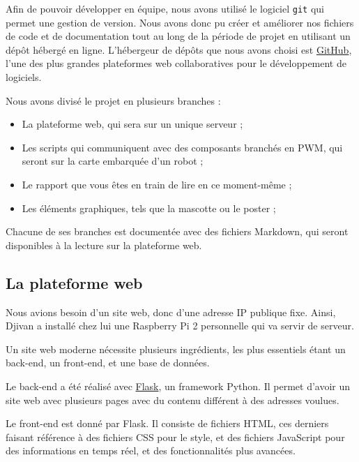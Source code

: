 \documentclass[a4paper,12pt]{report}  %
\begin{document}
Afin de pouvoir développer en équipe, nous avons utilisé le logiciel \texttt{git} qui permet une gestion de version. Nous avons donc pu créer et améliorer nos fichiers de code et de documentation tout au long de la période de projet en utilisant un dépôt hébergé en ligne. L'hébergeur de dépôts que nous avons choisi est \href{https://github.com/}{GitHub}, l'une des plus grandes plateformes web collaboratives pour le développement de logiciels. 

Nous avons divisé le projet en plusieurs branches : 

\begin{itemize}
	\item La plateforme web, qui sera sur un unique serveur ; 
	
	\item Les scripts qui communiquent avec des composants branchés en PWM, qui seront sur la carte embarquée d'un robot ; 
	
	\item Le rapport que vous êtes en train de lire en ce moment-même ; 
	
	\item Les éléments graphiques, tels que la mascotte ou le poster ; 
	
\end{itemize}

Chacune de ses branches est documentée avec des fichiers Markdown, qui seront disponibles à la lecture sur la plateforme web. 



\subsection{La plateforme web}

Nous avions besoin d'un site web, donc d'une adresse IP publique fixe. Ainsi, Djivan a installé chez lui une Raspberry Pi 2 personnelle qui va servir de serveur. 

Un site web moderne nécessite plusieurs ingrédients, les plus essentiels étant un back-end, un front-end, et une base de données. 

Le back-end a été réalisé avec \href{https://flask.palletsprojects.com/en/stable/}{Flask}, un framework Python. Il permet d'avoir un site web avec plusieurs pages avec du contenu différent à des adresses voulues. 

Le front-end est donné par Flask. Il consiste de fichiers HTML, ces derniers faisant référence à des fichiers CSS pour le style, et des fichiers JavaScript pour des informations en temps réel, et des fonctionnalités plus avancées. 
\end{document}
